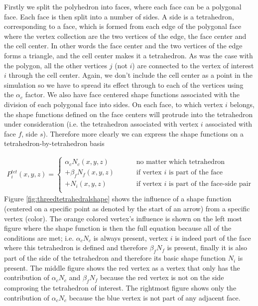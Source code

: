\documentclass[11pt,letterpaper,titlepage]{article}
\newcommand{\beqn}{\begin{equation}
	\begin{aligned}}
\newcommand{\eeqn}{\end{aligned}
	\end{equation}}
\begin{document}
Firstly we split the polyhedron into faces, where each face can be a polygonal face. Each face is then split into a number of sides. A side is a tetrahedron, corresponding to a face, which is formed from each edge of the polygonal face where the vertex collection are the two vertices of the edge, the face center and the cell center. In other words the face center and the two vertices of the edge forms a triangle, and the cell center makes it a tetrahedron.
\newline 
\newline
As was the case with the polygon, all the other vertices $j$ (not $i$) are connected to the vertex of interest $i$ through the cell center. Again, we don't include the cell center as a point in the simulation so we have to spread its effect through to each of the vertices using the $\alpha_c$ factor. We also have face centered shape functions associated with the division of each polygonal face into sides. On each face, to which vertex $i$ belongs, the shape functions defined on the face centers will protrude into the tetrahedron under consideration (i.e. the tetrahedron associated with vertex $i$ associated with face $f$, side $s$). Therefore more clearly we can express the shape functions on a tetrahedron-by-tetrahedron basis

\beqn
P_i^{tet}(x,y,z) = 
\begin{cases}
\alpha_c N_c (x,y,z)    \quad \quad &\text{ no matter which tetrahedron} \\
+\beta_f N_f(x,y,z)  \quad \quad &\text{ if vertex }i \text{ is part of the face} \\
+N_i (x,y,z) \quad \quad &\text{ if vertex }i \text{ is part of the face-side pair} \\
\end{cases}
\eeqn
\newline
Figure \ref{fig:threedtetrahedralshape} shows the influence of a shape function (centered on a specific point as denoted by the start of an arrow) from a specific vertex (color). The orange colored vertex's influence is shown on the left most figure where the shape function is then the full equation because all of the conditions are met; i.e. $\alpha_c N_c$ is always present, vertex $i$ is indeed part of the face where this tetrahedron is defined and therefore $\beta_f N_f$ is present, finally it is also part of the side of the tetrahedron and therefore its basic shape function $N_i$ is present.
\newline
\newline
The middle figure shows the red vertex as a vertex that only has the contribution of $\alpha_c N_c$ and $\beta_f N_f$ because the red vertex is not on the side comprosing the tetrahedron of interest. The rightmost figure shows only the contribution of $\alpha_c N_c$ because the blue vertex is not part of any adjacent face. 
\end{document}
